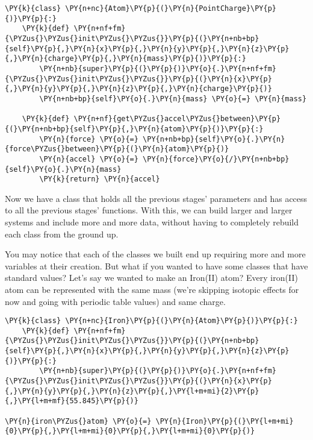    \begin{tcolorbox}[breakable, size=fbox, boxrule=1pt, pad at break*=1mm,colback=cellbackground, colframe=cellborder]
\begin{Verbatim}[commandchars=\\\{\}]
\PY{k}{class} \PY{n+nc}{Atom}\PY{p}{(}\PY{n}{PointCharge}\PY{p}{)}\PY{p}{:}
    \PY{k}{def} \PY{n+nf+fm}{\PYZus{}\PYZus{}init\PYZus{}\PYZus{}}\PY{p}{(}\PY{n+nb+bp}{self}\PY{p}{,}\PY{n}{x}\PY{p}{,}\PY{n}{y}\PY{p}{,}\PY{n}{z}\PY{p}{,}\PY{n}{charge}\PY{p}{,}\PY{n}{mass}\PY{p}{)}\PY{p}{:}
        \PY{n+nb}{super}\PY{p}{(}\PY{p}{)}\PY{o}{.}\PY{n+nf+fm}{\PYZus{}\PYZus{}init\PYZus{}\PYZus{}}\PY{p}{(}\PY{n}{x}\PY{p}{,}\PY{n}{y}\PY{p}{,}\PY{n}{z}\PY{p}{,}\PY{n}{charge}\PY{p}{)}
        \PY{n+nb+bp}{self}\PY{o}{.}\PY{n}{mass} \PY{o}{=} \PY{n}{mass}

    \PY{k}{def} \PY{n+nf}{get\PYZus{}accel\PYZus{}between}\PY{p}{(}\PY{n+nb+bp}{self}\PY{p}{,}\PY{n}{atom}\PY{p}{)}\PY{p}{:}
        \PY{n}{force} \PY{o}{=} \PY{n+nb+bp}{self}\PY{o}{.}\PY{n}{force\PYZus{}between}\PY{p}{(}\PY{n}{atom}\PY{p}{)}
        \PY{n}{accel} \PY{o}{=} \PY{n}{force}\PY{o}{/}\PY{n+nb+bp}{self}\PY{o}{.}\PY{n}{mass}
        \PY{k}{return} \PY{n}{accel}
\end{Verbatim}
\end{tcolorbox}

    Now we have a class that holds all the previous stages' parameters and
has access to all the previous stages' functions. With this, we can
build larger and larger systems and include more and more data, without
having to completely rebuild each class from the ground up.

You may notice that each of the classes we built end up requiring more
and more variables at their creation. But what if you wanted to have
some classes that have standard values? Let's say we wanted to make an
Iron(II) atom? Every iron(II) atom can be represented with the same mass
(we're skipping isotopic effects for now and going with periodic table
values) and same charge.

    \begin{tcolorbox}[breakable, size=fbox, boxrule=1pt, pad at break*=1mm,colback=cellbackground, colframe=cellborder]
\begin{Verbatim}[commandchars=\\\{\}]
\PY{k}{class} \PY{n+nc}{Iron}\PY{p}{(}\PY{n}{Atom}\PY{p}{)}\PY{p}{:}
    \PY{k}{def} \PY{n+nf+fm}{\PYZus{}\PYZus{}init\PYZus{}\PYZus{}}\PY{p}{(}\PY{n+nb+bp}{self}\PY{p}{,}\PY{n}{x}\PY{p}{,}\PY{n}{y}\PY{p}{,}\PY{n}{z}\PY{p}{)}\PY{p}{:}
        \PY{n+nb}{super}\PY{p}{(}\PY{p}{)}\PY{o}{.}\PY{n+nf+fm}{\PYZus{}\PYZus{}init\PYZus{}\PYZus{}}\PY{p}{(}\PY{n}{x}\PY{p}{,}\PY{n}{y}\PY{p}{,}\PY{n}{z}\PY{p}{,}\PY{l+m+mi}{2}\PY{p}{,}\PY{l+m+mf}{55.845}\PY{p}{)}

\PY{n}{iron\PYZus{}atom} \PY{o}{=} \PY{n}{Iron}\PY{p}{(}\PY{l+m+mi}{0}\PY{p}{,}\PY{l+m+mi}{0}\PY{p}{,}\PY{l+m+mi}{0}\PY{p}{)}
\end{Verbatim}
\end{tcolorbox}

